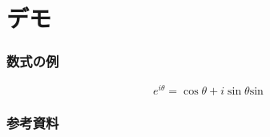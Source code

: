 \documentclass[unicode, 14pt, aspectratio=169]{beamer}
\begin{document}
\section{デモ}

\begin{frame}
  \frametitle{数式の例}
  \begin{equation}
    e^{i\theta} = \cos\theta + i\sin \theta \mathrm{sin}
  \end{equation}
\end{frame}



\begin{frame}[allowframebreaks]
  \frametitle{参考資料}
  \printbibliography
  \nocite{*} 
\end{frame}
\end{document}
